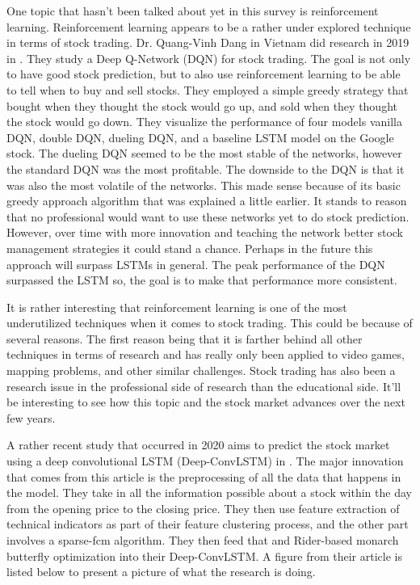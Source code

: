 \documentclass{article}
\theoremstyle{plain}
\theoremstyle{definition}
\numberwithin{equation}{section}
\numberwithin{theorem}{section}
\numberwithin{lemma}{section}
\numberwithin{definition}{section}
\numberwithin{proposition}{section}
\numberwithin{corollary}{section}
\begin{document}
	 
	 One topic that hasn't been talked about yet in this survey is reinforcement learning. Reinforcement learning appears to be a rather under explored technique in terms of stock trading. Dr. Quang-Vinh Dang in Vietnam did research in 2019 in \cite{Vinh2019}. They study a Deep Q-Network (DQN) for stock trading. The goal is not only to have good stock prediction, but to also use reinforcement learning to be able to tell when to buy and sell stocks. They employed a simple greedy strategy that bought when they thought the stock would go up, and sold when they thought the stock would go down. They visualize the performance of four models vanilla DQN, double DQN, dueling DQN, and a baseline LSTM model on the Google stock. The dueling DQN seemed to be the most stable of the networks, however the standard DQN was the most profitable. The downside to the DQN is that it was also the most volatile of the networks. This made sense because of its basic greedy approach algorithm that was explained a little earlier. It stands to reason that no professional would want to use these networks yet to do stock prediction. However, over time with more innovation and teaching the network better stock management strategies it could stand a chance. Perhaps in the future this approach will surpass LSTMs in general. The peak performance of the DQN surpassed the LSTM so, the goal is to make that performance more consistent.
	 
	 
	 It is rather interesting that reinforcement learning is one of the most underutilized techniques when it comes to stock trading. This could be because of several reasons. The first reason being that it is farther behind all other techniques in terms of research and has really only been applied to video games, mapping problems, and other similar challenges. Stock trading has also been a research issue in the professional side of research than the educational side. It'll be interesting to see how this topic and the stock market advances over the next few years.
	 
	 
	 A rather recent study that occurred in 2020 aims to predict the stock market using a deep convolutional LSTM (Deep-ConvLSTM) in \cite{Kelotra2020}. The major innovation that comes from this article is the preprocessing of all the data that happens in the model. They take in all the information possible about a stock within the day from the opening price to the closing price. They then use feature extraction of technical indicators as part of their feature clustering process, and the other part involves a sparse-fcm algorithm. They then feed that and Rider-based monarch butterfly optimization into their Deep-ConvLSTM. A figure from their article is listed below to present a picture of what the research is doing.
	 
\end{document}
